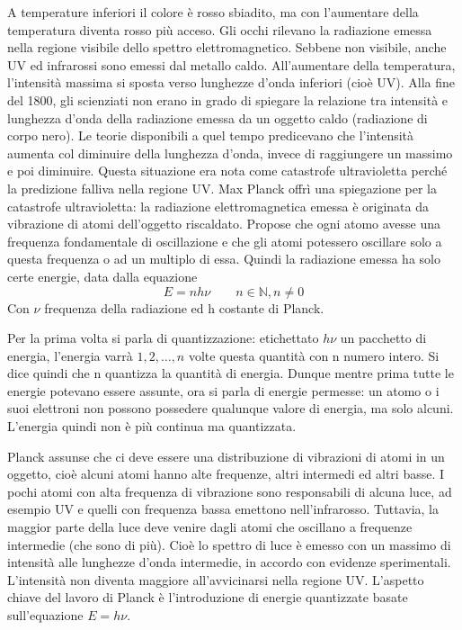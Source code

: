 A temperature inferiori il colore è rosso sbiadito, ma con l'aumentare della temperatura diventa rosso più acceso. Gli occhi rilevano la radiazione emessa nella regione visibile dello spettro elettromagnetico. Sebbene non visibile, anche UV ed infrarossi sono emessi dal metallo caldo. All'aumentare della temperatura, l'intensità massima si sposta verso lunghezze d'onda inferiori (cioè UV). Alla fine del 1800, gli scienziati non erano in grado di spiegare la relazione tra intensità e lunghezza d'onda della radiazione emessa da un oggetto caldo (radiazione di corpo nero). Le teorie disponibili a quel tempo predicevano che l'intensità aumenta col diminuire della lunghezza d'onda, invece di raggiungere un massimo e poi diminuire. Questa situazione era nota come catastrofe ultravioletta perché la predizione falliva nella regione UV. Max Planck offrì una spiegazione per la catastrofe ultravioletta: la radiazione elettromagnetica emessa è originata da vibrazione di atomi dell'oggetto riscaldato. Propose che ogni atomo avesse una frequenza fondamentale di oscillazione e che gli atomi potessero oscillare solo a questa frequenza o ad un multiplo di essa. Quindi la radiazione emessa ha solo certe energie, data dalla equazione 
$$E=nh\nu \qquad n\in\mathbb{N},n \neq 0 $$
Con $\nu$ frequenza della radiazione ed h costante di Planck.

Per la prima volta si parla di quantizzazione: etichettato $h\nu$ un pacchetto di energia, l'energia varrà $1, 2, \dots, n$ volte questa quantità con n numero intero. Si dice quindi che n quantizza la quantità di energia.
Dunque mentre prima tutte le energie potevano essere  assunte, ora si parla di energie permesse: un atomo o i suoi elettroni non possono possedere qualunque valore di energia, ma solo alcuni. L'energia quindi non è più continua ma quantizzata.

Planck assunse che ci deve essere una distribuzione di vibrazioni di atomi in un oggetto, cioè alcuni atomi hanno alte frequenze, altri intermedi ed altri basse. I pochi atomi con alta frequenza di vibrazione sono responsabili di alcuna luce, ad esempio UV e quelli con frequenza bassa emettono nell'infrarosso. Tuttavia, la maggior parte della luce deve venire dagli atomi che oscillano a frequenze intermedie (che sono di più). Cioè lo spettro di luce è emesso con un massimo di intensità alle lunghezze d'onda intermedie, in accordo con evidenze sperimentali. L'intensità non diventa maggiore all'avvicinarsi nella regione UV.
L'aspetto chiave del lavoro di Planck è l'introduzione di energie quantizzate basate sull'equazione $E=h\nu$.

